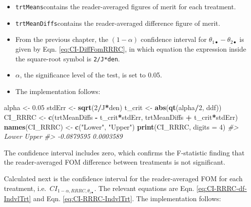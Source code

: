 \documentclass[
]{book}
\newenvironment{Shaded}{\begin{snugshade}}{\end{snugshade}}
\newcommand{\CommentTok}[1]{\textcolor[rgb]{0.56,0.35,0.01}{\textit{#1}}}
\newcommand{\DataTypeTok}[1]{\textcolor[rgb]{0.13,0.29,0.53}{#1}}
\newcommand{\DecValTok}[1]{\textcolor[rgb]{0.00,0.00,0.81}{#1}}
\newcommand{\FloatTok}[1]{\textcolor[rgb]{0.00,0.00,0.81}{#1}}
\newcommand{\KeywordTok}[1]{\textcolor[rgb]{0.13,0.29,0.53}{\textbf{#1}}}
\newcommand{\NormalTok}[1]{#1}
\newcommand{\OperatorTok}[1]{\textcolor[rgb]{0.81,0.36,0.00}{\textbf{#1}}}
\newcommand{\StringTok}[1]{\textcolor[rgb]{0.31,0.60,0.02}{#1}}
\providecommand{\tightlist}{%
  \setlength{\itemsep}{0pt}\setlength{\parskip}{0pt}}
\begin{document}
\begin{itemize}
\tightlist
\item
  \texttt{trtMeans}contains the reader-averaged figures of merit for each treatment.
\item
  \texttt{trtMeanDiffs}contains the reader-averaged difference figure of merit.
\item
  From the previous chapter, the \((1-\alpha)\) confidence interval for \(\theta_{1 \bullet} - \theta_{2 \bullet}\) is given by Eqn. \eqref{eq:CI-DiffFomRRRC}, in which equation the expression inside the square-root symbol is \texttt{2/J*den}.
\item
  \(\alpha\), the significance level of the test, is set to 0.05.
\item
  The implementation follows:
\end{itemize}

\begin{Shaded}
\begin{Highlighting}[]
\NormalTok{alpha \textless{}{-}}\StringTok{ }\FloatTok{0.05}
\NormalTok{stdErr \textless{}{-}}\StringTok{ }\KeywordTok{sqrt}\NormalTok{(}\DecValTok{2}\OperatorTok{/}\NormalTok{J}\OperatorTok{*}\NormalTok{den)}
\NormalTok{t\_crit \textless{}{-}}\StringTok{ }\KeywordTok{abs}\NormalTok{(}\KeywordTok{qt}\NormalTok{(alpha}\OperatorTok{/}\DecValTok{2}\NormalTok{, ddf))}
\NormalTok{CI\_RRRC \textless{}{-}}\StringTok{ }\KeywordTok{c}\NormalTok{(trtMeanDiffs }\OperatorTok{{-}}\StringTok{ }\NormalTok{t\_crit}\OperatorTok{*}\NormalTok{stdErr, }
\NormalTok{             trtMeanDiffs }\OperatorTok{+}\StringTok{ }\NormalTok{t\_crit}\OperatorTok{*}\NormalTok{stdErr)}
\KeywordTok{names}\NormalTok{(CI\_RRRC) \textless{}{-}}\StringTok{ }\KeywordTok{c}\NormalTok{(}\StringTok{"Lower"}\NormalTok{, }\StringTok{"Upper"}\NormalTok{)}
\KeywordTok{print}\NormalTok{(CI\_RRRC, }\DataTypeTok{digits =} \DecValTok{4}\NormalTok{)}
\CommentTok{\#\textgreater{}      Lower      Upper }
\CommentTok{\#\textgreater{} {-}0.0879595  0.0003589}
\end{Highlighting}
\end{Shaded}

The confidence interval includes zero, which confirms the F-statistic finding that the reader-averaged FOM difference between treatments is not significant.

Calculated next is the confidence interval for the reader-averaged FOM for each treatment, i.e.~\(CI_{1-\alpha,RRRC,\theta_{i \bullet}}\). The relevant equations are Eqn. \eqref{eq:CI-RRRC-df-IndvlTrt} and Eqn. \eqref{eq:CI-RRRC-IndvlTrt}. The implementation follows:
\end{document}

